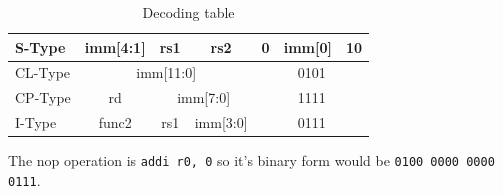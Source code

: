 \documentclass[a4paper,12pt]{article}
\begin{document}
\begin{table}[H]
\begin{tabular}{lclclclcccc}
\multicolumn{1}{|l|}{S-Type}  & \multicolumn{2}{c|}{imm{[}4:1{]}}   & \multicolumn{2}{c|}{rs1}              & \multicolumn{2}{c|}{rs2}             & \multicolumn{1}{c|}{0} & \multicolumn{1}{c|}{imm{[}0{]}} & \multicolumn{2}{c|}{10}                                  \\ \hline
\multicolumn{1}{|l|}{CL-Type} & \multicolumn{6}{c|}{imm{[}11:0{]}}                                                                                 & \multicolumn{4}{c|}{0101}                                                                                           \\ \hline
\multicolumn{1}{|l|}{CP-Type} & \multicolumn{2}{c|}{rd}             & \multicolumn{4}{c|}{imm{[}7:0{]}}                                            & \multicolumn{4}{c|}{1111}                                                                                           \\ \hline
\multicolumn{1}{|l|}{I-Type}  & \multicolumn{2}{c|}{func2}          & \multicolumn{2}{c|}{rs1}              & \multicolumn{2}{c|}{imm{[}3:0{]}}             & \multicolumn{4}{c|}{0111}                                                                                           \\ \hline
\end{tabular}
\caption{Decoding table}
\end{table}
\label{tab:decoding_table}
The nop operation is \texttt{addi r0, 0} so it's binary form would be \texttt{0100 0000 0000 0111}.
\end{document}

